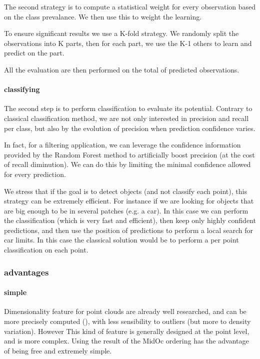 				The second strategy is to compute a statistical weight for every observation based on the class prevalance. 
				We then use this to weight the learning.
				
				To ensure significant results we use a K-fold strategy. 
				We randomly split the observations into K parts, then for each part, we use the K-1 others to learn and predict on the part.
				
				All the evaluation are then performed on the total of predicted observations.
				
			\paragraph{classifying}
				
				The second step is to perform classification to evaluate its potential.
				Contrary to classical classification method, we are not only interested in precision and recall per class, but also by the evolution of precision when prediction confidence varies.
				
				In fact, for a filtering application, we can leverage the confidence information provided by the Random Forest method to artificially boost precision (at the cost of recall diminution). We can do this by limiting the minimal confidence allowed for every prediction.
			 	
			 	We stress that if the goal is to detect objects (and not classify each point), this strategy can be extremely efficient.
			 	For instance if we are looking for objects that are big enough to be in several patches (e.g. a car).
			 	In this case we can perform the classification (which is very fast and efficient), then keep only highly confident predictions, and then use the position of predictions to perform a local search for car limits.
			 	In this case the classical solution would be to perform a per point classification on each point.
			 	
			 	
		\subsubsection{advantages}
			\paragraph{simple}
				Dimensionality feature for point clouds are already well researched, and can be more precisely computed (\cite{Demantke2014}), with less sensibility to outliers (but more to density variation). However This kind of feature is generally designed at the point level, and is more complex.
				Using the result of the MidOc ordering has the advantage of being free and extremely simple. 
